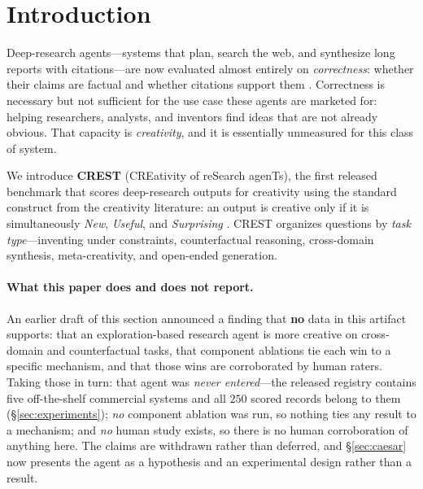 \section{Introduction}
\label{sec:intro}

Deep-research agents---systems that plan, search the web, and synthesize long reports with
citations---are now evaluated almost entirely on \emph{correctness}: whether their claims are
factual and whether citations support them \citep{du2025deepresearchbench,liveresearchbench2025,
mialon2023gaia,wei2025browsecomp}. Correctness is necessary but not sufficient for the use case
these agents are marketed for: helping researchers, analysts, and inventors find ideas that are
not already obvious. That capacity is \emph{creativity}, and it is essentially unmeasured for
this class of system.

We introduce \textbf{CREST} (CREativity of reSearch agenTs), the first released benchmark that
scores deep-research outputs for creativity using the standard construct from the creativity
literature: an output is creative only if it is simultaneously \emph{New}, \emph{Useful}, and
\emph{Surprising} \citep{runco2012standard,boden2004creative,amabile1982cat}. CREST organizes
questions by \emph{task type}---inventing under constraints, counterfactual reasoning, cross-domain
synthesis, meta-creativity, and open-ended generation.

\paragraph{What this paper does and does not report.} An earlier draft of this section announced a
finding that \textbf{no} data in this artifact supports: that an exploration-based research agent is
more creative on cross-domain and counterfactual tasks, that component ablations tie each win to a
specific mechanism, and that those wins are corroborated by human raters. Taking those in turn:
that agent was \emph{never entered}---the released registry contains five off-the-shelf commercial
systems and all $250$ scored records belong to them (\S\ref{sec:experiments}); \emph{no} component
ablation was run, so nothing ties any result to a mechanism; and \emph{no} human study exists, so
there is no human corroboration of anything here. The claims are withdrawn rather than deferred, and
\S\ref{sec:caesar} now presents the agent as a hypothesis and an experimental design rather than a
result.


